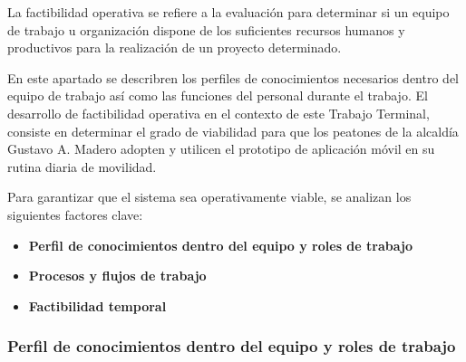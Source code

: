 




La factibilidad operativa se refiere a la evaluación para determinar si un equipo de trabajo u organización dispone de los suficientes recursos humanos y productivos para la realización de un proyecto determinado. 

En este apartado se describren los perfiles de conocimientos necesarios dentro del equipo de trabajo así como las funciones del personal durante el trabajo. El desarrollo de factibilidad operativa en el contexto de este Trabajo Terminal, consiste en determinar el grado de viabilidad para que los peatones de la alcaldía Gustavo A. Madero adopten y utilicen el prototipo de aplicación móvil en su rutina diaria de movilidad.

Para garantizar que el sistema sea operativamente viable, se analizan los siguientes factores clave:

\begin{itemize}
    \item \textbf{Perfil de conocimientos dentro del equipo y roles de trabajo}
    \item\textbf{Procesos y flujos de trabajo}
    \item \textbf{Factibilidad temporal}
\end{itemize}

\subsubsection{Perfil de conocimientos dentro del equipo y roles de trabajo}

